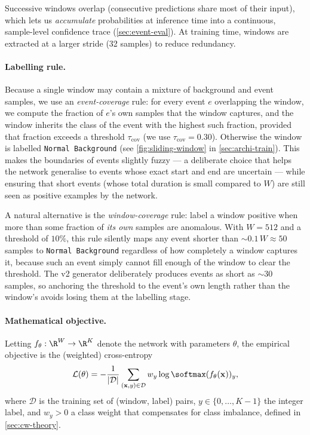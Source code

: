 Successive windows overlap (consecutive predictions share most of their
input), which lets us \emph{accumulate} probabilities at inference time
into a continuous, sample-level confidence trace
(\cref{sec:event-eval}). At training time, windows are extracted at a
larger stride (32 samples) to reduce redundancy.

\paragraph{Labelling rule.}
Because a single window may contain a mixture of background and event
samples, we use an \emph{event-coverage} rule: for every event $e$
overlapping the window, we compute the fraction of $e$'s own samples
that the window captures, and the window inherits the class of the
event with the highest such fraction, provided that fraction exceeds
a threshold $\tau_{\text{cov}}$ (we use $\tau_{\text{cov}} = 0.30$).
Otherwise the window is labelled \texttt{Normal Background}
(see \cref{fig:sliding-window} in \cref{sec:archi-train}). This makes
the boundaries of events slightly fuzzy --- a deliberate choice that
helps the network generalise to events whose exact start and end are
uncertain --- while ensuring that short events (whose total duration
is small compared to $W$) are still seen as positive examples by the
network.

A natural alternative is the \emph{window-coverage} rule: label a
window positive when more than some fraction of \emph{its own}
samples are anomalous. With $W = 512$ and a threshold of $10\%$, this
rule silently maps any event shorter than $\sim 0.1\,W \approx 50$
samples to \texttt{Normal Background} regardless of how completely a
window captures it, because such an event simply cannot fill enough
of the window to clear the threshold. The v2 generator deliberately
produces events as short as $\sim 30$ samples, so anchoring the
threshold to the event's own length rather than the window's avoids
losing them at the labelling stage.

\paragraph{Mathematical objective.}
Letting $f_\theta : \R^W \to \R^K$ denote the network with parameters
$\theta$, the empirical objective is the (weighted) cross-entropy
\begin{equation}
    \mathcal{L}(\theta) = - \frac{1}{|\mathcal{D}|} \sum_{(\mathbf{x}, y) \in \mathcal{D}}
        w_y \log \softmax(f_\theta(\mathbf{x}))_y,
    \label{eq:cross-entropy}
\end{equation}
where $\mathcal{D}$ is the training set of (window, label) pairs,
$y \in \{0, \dots, K-1\}$ the integer label, and $w_y > 0$ a class
weight that compensates for class imbalance, defined in
\cref{sec:cw-theory}.

